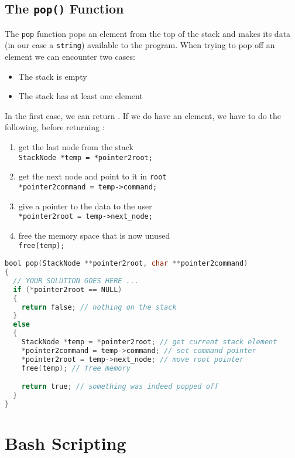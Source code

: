 \documentclass[a4paper, 11pt]{article}
\begin{document}
    \subsection{The \texttt{pop()} Function}
    The \texttt{pop} function pops an element from the top of the stack and makes its data (in our case a \texttt{string}) 
    available to the program. When trying to pop off an element we can encounter two cases:
    \begin{itemize}
      \item The stack is empty
      \item The stack has at least one element
    \end{itemize}
    In the first case, we can return \texttt{\color{blue}{false}}. If we do have an element, we have to do the following, 
    before returning \texttt{\color{blue}{true}}:
    \begin{enumerate}
      \item get the last node from the stack\\
            \lstinline{StackNode *temp = *pointer2root;}
      \item get the next node and point to it in \texttt{root} \\
            \lstinline{*pointer2command = temp->command;}
      \item give a pointer to the data to the user \\
            \lstinline{*pointer2root = temp->next_node;}
      \item free the memory space that is now unused \\
            \lstinline{free(temp);}
    \end{enumerate}
    \begin{lstlisting}[language=C,caption={The \texttt{pop()} Function},label={pop}]
bool pop(StackNode **pointer2root, char **pointer2command)
{
  // YOUR SOLUTION GOES HERE ...
  if (*pointer2root == NULL)
  {
    return false; // nothing on the stack
  }
  else
  {
    StackNode *temp = *pointer2root; // get current stack element
    *pointer2command = temp->command; // set command pointer
    *pointer2root = temp->next_node; // move root pointer
    free(temp); // free memory

    return true; // something was indeed popped off
  }
}
    \end{lstlisting}
    \newpage

    \section{Bash Scripting}
\end{document}
